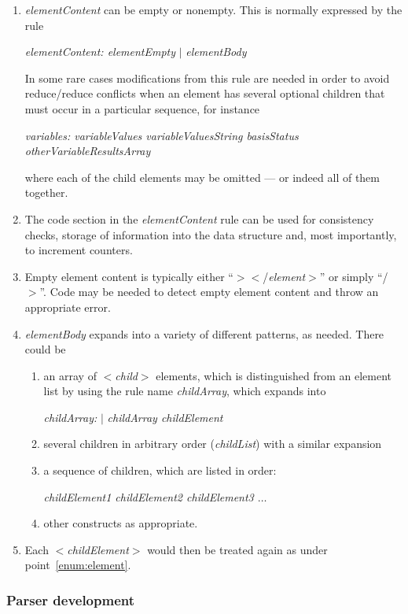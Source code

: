 \begin{enumerate}
\item	{\it elementContent\/} can be empty or nonempty. This is normally expressed by the rule

{\it elementContent: elementEmpty} $\vert$ {\it elementBody}

In some rare cases modifications from this rule are needed in order to avoid reduce/reduce conflicts 
when an element has several optional children that must occur in a particular sequence, for instance

{\it variables: variableValues variableValuesString basisStatus otherVariableResultsArray}

where each of the child elements may be omitted --- or indeed all of them together.

\item	The code section in the {\it elementContent\/} rule can be used for consistency checks, 
storage of information into the data structure and, most importantly, to increment counters. 

\item	Empty element content is typically either ``$><$/{\it element\/}$>$'' or simply ``/$>$''. 
Code may be needed to detect empty element content and throw an appropriate error.

\item	{\it elementBody\/} expands into a variety of different patterns, as needed. There could be
\begin{enumerate}
\item	an array of $<${\it child\/}$>$ elements, which is distinguished from an element list 
by using the rule name {\it childArray\/}, which expands into 

{\it childArray:} $\vert$ {\it childArray childElement}
\item	several children in arbitrary order ({\it childList}) with a similar expansion
\item      a sequence of children, which are listed in order:

{\it childElement1  childElement2  childElement3 $\ldots$}

\item	other constructs as appropriate.
\end{enumerate}
\item	Each $<${\it childElement\/}$>$ would then be treated again as under point~\ref{enum:element}.

\end{enumerate}


\subsubsection{Parser development}\label{section:ParserDevelopment}

